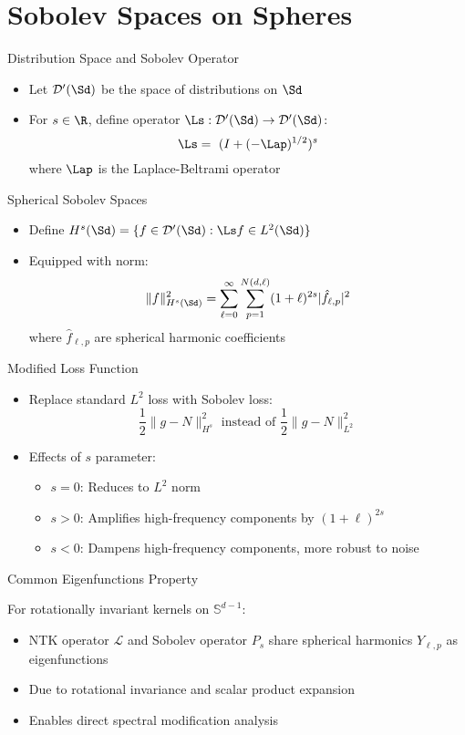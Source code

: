     
\section{Sobolev Spaces on Spheres}

\begin{frame}{Distribution Space and Sobolev Operator}
\begin{itemize}
\item Let $\mathcal{D}'(\Sd)$ be the space of distributions on $\Sd$
\item For $s \in \R$, define operator $\Ls: \mathcal{D}'(\Sd) \to \mathcal{D}'(\Sd)$:
\[ \Ls = \ (I + (-\Lap)^{1/2})^s \]
where $\Lap$ is the Laplace-Beltrami operator
\end{itemize}
\end{frame}

\begin{frame}{Spherical Sobolev Spaces}
\begin{itemize}
\item Define $H^s(\Sd) = \{f \in \mathcal{D}'(\Sd) : \Ls f \in L^2(\Sd)\}$
\item Equipped with norm:
\[ \|f\|^2_{H^s(\Sd)} = \sum_{\ell=0}^{\infty} \sum_{p=1}^{N(d,\ell)} (1+\ell)^{2s} |\hat{f}_{\ell,p}|^2 \]
where $\hat{f}_{\ell,p}$ are spherical harmonic coefficients
\end{itemize}
\end{frame}






\begin{frame}{Modified Loss Function}
\begin{itemize}
\item Replace standard $L^2$ loss with Sobolev loss:
\[ \frac{1}{2}\|g-N\|^2_{H^s} \text{ instead of } \frac{1}{2}\|g-N\|^2_{L^2} \]
\item Effects of $s$ parameter:
\begin{itemize}
\item $s = 0$: Reduces to $L^2$ norm
\item $s > 0$: Amplifies high-frequency components by $(1+\ell)^{2s}$
\item $s < 0$: Dampens high-frequency components, more robust to noise
\end{itemize}
\end{itemize}
\end{frame}


\begin{frame}{Common Eigenfunctions Property}
\begin{theorem}
For rotationally invariant kernels on $\mathbb{S}^{d-1}$:
\begin{itemize}
\item NTK operator $\mathcal{L}$ and Sobolev operator $P_s$ share spherical harmonics $Y_{\ell,p}$ as eigenfunctions
\item Due to rotational invariance and scalar product expansion
\item Enables direct spectral modification analysis
\end{itemize}
\end{theorem}
\end{frame}

